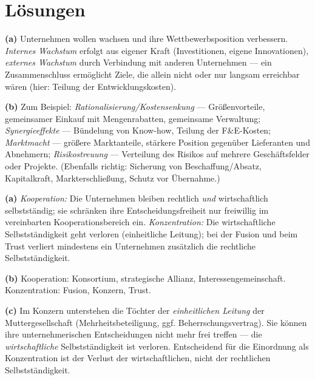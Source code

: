 \documentclass[11pt, a4paper]{article}
\begin{document}
\newpage
\section{Lösungen}\label{loesungen}

\begin{loesung}[title={Lösung Aufgabe~1 --- Gründe und Ziele}]
\textbf{(a)} Unternehmen wollen wachsen und ihre Wettbewerbsposition verbessern.
\emph{Internes Wachstum} erfolgt aus eigener Kraft (Investitionen, eigene Innovationen),
\emph{externes Wachstum} durch Verbindung mit anderen Unternehmen --- ein Zusammenschluss
ermöglicht Ziele, die allein nicht oder nur langsam erreichbar wären (hier: Teilung der
Entwicklungskosten).

\textbf{(b)} Zum Beispiel: \emph{Rationalisierung/Kostensenkung} --- Größenvorteile,
gemeinsamer Einkauf mit Mengenrabatten, gemeinsame Verwaltung; \emph{Synergieeffekte} ---
Bündelung von Know-how, Teilung der F\&E-Kosten; \emph{Marktmacht} --- größere
Marktanteile, stärkere Position gegenüber Lieferanten und Abnehmern;
\emph{Risikostreuung} --- Verteilung des Risikos auf mehrere Geschäftsfelder oder
Projekte. (Ebenfalls richtig: Sicherung von Beschaffung/Absatz, Kapitalkraft,
Markterschließung, Schutz vor Übernahme.)
\end{loesung}

\begin{loesung}[title={Lösung Aufgabe~2 --- Kooperation vs. Konzentration}]
\textbf{(a)} \emph{Kooperation:} Die Unternehmen bleiben rechtlich \emph{und}
wirtschaftlich selbstständig; sie schränken ihre Entscheidungsfreiheit nur freiwillig im
vereinbarten Kooperationsbereich ein. \emph{Konzentration:} Die wirtschaftliche
Selbstständigkeit geht verloren (einheitliche Leitung); bei der Fusion und beim Trust
verliert mindestens ein Unternehmen zusätzlich die rechtliche Selbstständigkeit.

\textbf{(b)} Kooperation: Konsortium, strategische Allianz, Interessengemeinschaft.
Konzentration: Fusion, Konzern, Trust.

\textbf{(c)} Im Konzern unterstehen die Töchter der \emph{einheitlichen Leitung} der
Muttergesellschaft (Mehrheitsbeteiligung, ggf. Beherrschungsvertrag). Sie können ihre
unternehmerischen Entscheidungen nicht mehr frei treffen --- die \emph{wirtschaftliche}
Selbstständigkeit ist verloren. Entscheidend für die Einordnung als Konzentration ist der
Verlust der wirtschaftlichen, nicht der rechtlichen Selbstständigkeit.
\end{loesung}
\end{document}
